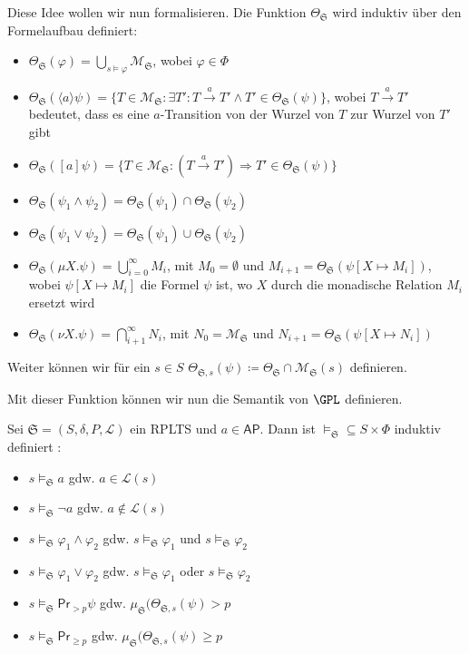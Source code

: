 Diese Idee wollen wir nun formalisieren. Die Funktion $\Theta_\mathfrak{S}$ wird induktiv über den Formelaufbau definiert:
\begin{itemize}
	\item $\Theta_\mathfrak{S}(\varphi) = \bigcup_{s\models \varphi}\mathcal{M}_\mathfrak{S}$, wobei $\varphi\in \Phi$
	\item $\Theta_\mathfrak{S}(\langle a\rangle \psi) = \{T\in \mathcal{M}_\mathfrak{S} : \exists T' : T\xrightarrow{a}T' \land T'\in \Theta_\mathfrak{S}(\psi)\}$, wobei $T\xrightarrow{a}T'$ bedeutet, dass es eine $a$-Transition von der Wurzel von $T$ zur Wurzel von $T'$ gibt
	\item $\Theta_\mathfrak{S}([a]\psi) = \{T\in \mathcal{M}_\mathfrak{S} : (T\xrightarrow{a}T') \Rightarrow T'\in \Theta_\mathfrak{S}(\psi)\}$
	\item $\Theta_\mathfrak{S}(\psi_1\land \psi_2) = \Theta_\mathfrak{S}(\psi_1)\cap \Theta_\mathfrak{S}(\psi_2)$
	\item $\Theta_\mathfrak{S}(\psi_1\lor\psi_2) = \Theta_\mathfrak{S}(\psi_1) \cup \Theta_\mathfrak{S}(\psi_2)$
	\item $\Theta_\mathfrak{S}(\mu X.\psi) = \bigcup_{i=0}^\infty M_i$, mit $M_0=\emptyset$ und $M_{i+1} = \Theta_\mathfrak{S}(\psi[X\mapsto M_i])$, wobei $\psi[X\mapsto M_i]$ die Formel $\psi$ ist, wo $X$ durch die monadische Relation $M_i$ ersetzt wird
	\item $\Theta_\mathfrak{S}(\nu X.\psi) = \bigcap_{i+1}^\infty N_i$, mit $N_0=\mathcal{M}_\mathfrak{S}$ und $N_{i+1}=\Theta_\mathfrak{S}(\psi[X\mapsto N_i])$
\end{itemize}
Weiter können wir für ein $s\in S$ $\Theta_{\mathfrak{S},s}(\psi)\coloneqq \Theta_\mathfrak{S}\cap \mathcal{M}_\mathfrak{S}(s)$ definieren. \cite{cleaveland2005probabilistic}

Mit dieser Funktion können wir nun die Semantik von $\GPL$ definieren.
\begin{definition}
	Sei $\mathfrak{S}=(S,\delta,P,\mathcal{L})$ ein RPLTS und $a\in \mathsf{AP}$. Dann ist $\models_\mathfrak{S}\subseteq S\times \Phi$ induktiv definiert \cite{cleaveland2005probabilistic}:
	\begin{itemize}
		\item $s\models_\mathfrak{S} a$ gdw. $a\in \mathcal{L}(s)$
		\item $s\models_\mathfrak{S} \neg a$ gdw. $a\notin \mathcal{L}(s)$
		\item $s\models_\mathfrak{S} \varphi_1\land\varphi_2$ gdw. $s\models_\mathfrak{S}\varphi_1$ und $s\models_\mathfrak{S}\varphi_2$
		\item $s\models_\mathfrak{S} \varphi_1\lor\varphi_2$ gdw. $s\models_\mathfrak{S}\varphi_1$ oder $s\models_\mathfrak{S}\varphi_2$
		\item $s\models_\mathfrak{S} \mathsf{Pr}_{>p}\psi$ gdw. $\mu_\mathfrak{S}(\Theta_{\mathfrak{S},s}(\psi)>p$
		\item $s\models_\mathfrak{S} \mathsf{Pr}_{\geq p}$ gdw. $\mu_\mathfrak{S}(\Theta_{\mathfrak{S},s}(\psi)\geq p$
	\end{itemize}
\end{definition}

